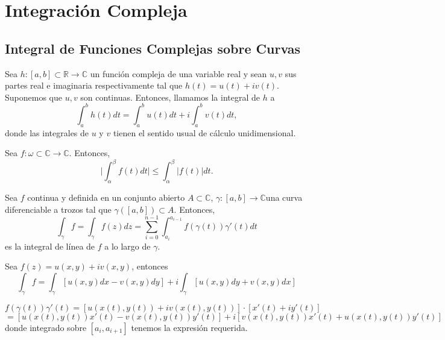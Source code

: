 \chapter{Integración Compleja}

\section{Integral de Funciones Complejas sobre Curvas}

\begin{defn}[Integral]
  Sea $h: [a, b] \subset \mathbb{R} \to \mathbb{C}$ un función compleja de una variable real y sean $u, v$ sus partes real e imaginaria respectivamente tal que $h(t) = u(t) + i v(t)$. Suponemos que $u, v$ son continuas. Entonces, llamamos la integral de $h$ a
  \[ 
    \int_{a}^{b} h(t) dt = \int_{a}^{b} u(t) dt + i \int_{a}^{b} v(t) dt,
  \] 
  donde las integrales de $u$ y $v$ tienen el sentido usual de cálculo unidimensional.
\end{defn}

\begin{prop}
  Sea $f : \omega \subset \mathbb{C} \to \mathbb{C}$. Entonces,
  \[ 
    \Bigg | \int_{\alpha}^{\beta} f(t) dt \Bigg | \leq  \int_{\alpha}^{\beta} \big | f(t) \big | dt.
  \] 
\end{prop}

\begin{defn}
  Sea $f$ continua y definida en un conjunto abierto $A \subset \mathbb{C}$, $\gamma: [a, b] \to \mathbb{C}$una curva diferenciable a trozos tal que $\gamma([a, b]) \subset A$. Entonces,
  \[ 
    \int_{\gamma}^{} f = \int_{\gamma}^{} f(z) dz = \sum_{i = 0}^{n-1} \int_{a_{i}}^{a_{i-1}} f(\gamma(t))\gamma'(t) dt
  \]
  es la integral de línea de $f$ a lo largo de $\gamma$.
\end{defn}

\begin{prop}
  Sea $ f(z) = u(x, y)+ i v(x, y)$, entonces
  \[ 
    \int_{\gamma}^{} f = \int_{\gamma}^{} [u(x, y)dx - v(x, y)dy] + i \int_{\gamma}^{} [u(x,y)dy + v(x, y)dx]
  \] 
\end{prop}

\begin{dem}
  \[ 
    f(\gamma(t))\gamma'(t) = [u(x(t), y(t)) + i v(x(t), y(t))] \cdot [x'(t) + iy'(t)]
  \] 
  \[ 
    = [u(x(t), y(t))x'(t) - v(x(t), y(t))y'(t)] + i[v(x(t), y(t))x'(t) + u(x(t), y(t))y'(t)]
  \] 
  donde integrado sobre $[a_{i}, a_{i +1}]$ tenemos la expresión requerida.
\end{dem}

